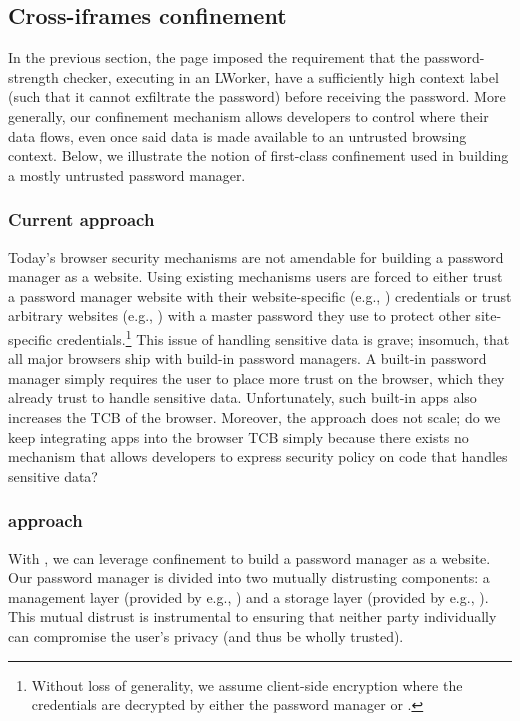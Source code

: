\subsection{Cross-iframes confinement}
\label{sec:system:iframe}

In the previous section, the  page imposed the
requirement that the password-strength checker, executing in an
LWorker, have a sufficiently high context label (such that it cannot
exfiltrate the password) before receiving the password.
%
More generally, our confinement mechanism allows developers to control
where their data flows, even once said data is made available to an
untrusted browsing context.
%
Below, we illustrate the notion of first-class confinement used
in building a mostly untrusted password manager.

\subsubsection{Current approach}
%
Today's browser security mechanisms are not amendable for building a
password manager as a website.
%
Using existing mechanisms users are forced to either trust a password
manager website with their website-specific (e.g., )
credentials or trust arbitrary websites (e.g., ) with a
master password they use to protect other site-specific
credentials.\footnote{
  Without loss of generality, we assume client-side encryption where
  the credentials are decrypted by either the password manager or
  .
}
%
This issue of handling sensitive data is grave; insomuch, that all
major browsers ship with build-in password managers.
%
A built-in password manager simply requires the user to place more
trust on the browser, which they already trust to handle sensitive
data.
%
Unfortunately, such built-in apps also increases the TCB of the
browser.
%
Moreover, the approach does not scale; do we keep integrating apps
into the browser TCB simply because there exists no mechanism that
allows developers to express security policy on code that handles
sensitive data?

\subsubsection{\sys{} approach}
%
With \sys{}, we can leverage confinement to build a password manager
as a website.
%
Our password manager is
divided into two mutually distrusting components: a
management layer (provided by e.g., ) and a storage
layer (provided by e.g., ).
%
This mutual distrust is instrumental to ensuring that neither party
individually can compromise the user's privacy (and thus be wholly
trusted).
%

